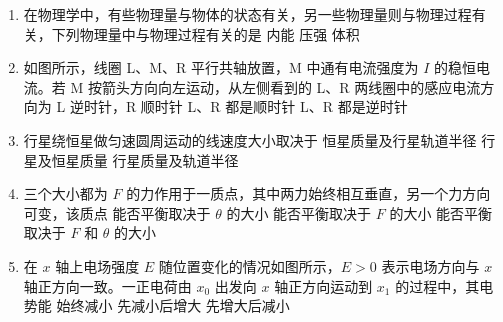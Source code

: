 \documentclass[\gkver]{gaokaozhenti}
\begin{document}
\begin{enumerate}
\item
在物理学中，有些物理量与物体的状态有关，另一些物理量则与物理过程有关，下列物理量中与物理过程有关的是
{内能}
{压强}
{体积}

\item
如图所示，线圈 L、M、R 平行共轴放置，M 中通有电流强度为 $I$ 的稳恒电流。若 M 按箭头方向向左运动，从左侧看到的 L、R 两线圈中的感应电流方向为
\onepicture[w=4.27cm]{}
{L 逆时针，R 顺时针}
{L、R 都是顺时针}
{L、R 都是逆时针}

\item
行星绕恒星做匀速圆周运动的线速度大小取决于
{恒星质量及行星轨道半径}
{行星及恒星质量}
{行星质量及轨道半径}

\item
三个大小都为 $F$ 的力作用于一质点，其中两力始终相互垂直，另一个力方向可变，该质点
\onepicture[w=2.92cm]{}
{能否平衡取决于 $\theta$ 的大小}
{能否平衡取决于 $F$ 的大小}
{能否平衡取决于 $F$ 和 $\theta$ 的大小}

\item
在 $x$ 轴上电场强度 $E$ 随位置变化的情况如图所示，$E>0$ 表示电场方向与 $x$ 轴正方向一致。一正电荷由 $x_{0}$ 出发向 $x$ 轴正方向运动到 $x_{1}$ 的过程中，其电势能
\onepicture[w=3.34cm]{}
{始终减小}
{先减小后增大}
{先增大后减小}


\end{enumerate}
\end{document}

